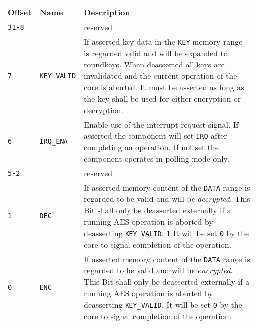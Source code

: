 \documentclass{ruschidoc}
\begin{document}
\begin{tabularx}{\textwidth}{|p{13mm}|p{18mm} |X|}
  \hline
  \bf{Offset} 	  & \bf{Name} & \bf{Description}\\ \hline
  \texttt{31-8} & --- & reserved \\ \hline 	 
  \texttt{7} 	 &\texttt{KEY\_VALID} &If asserted key data in the \texttt{KEY} memory range is regarded valid and will be expanded to roundkeys. 
	When deasserted all keys are invalidated and the current operation of the core is aborted. It must be asserted as long as the key shall be 
	used for either encryption or decryption. \\ \hline
  \texttt{6}   & \texttt{IRQ\_ENA}  & Enable use of the interrupt request signal. If asserted the component will set \texttt{IRQ} after 
					completing an operation. If not set the component operates in polling mode only.\\ \hline	 
  \texttt{5-2}   & --- &reserved  \\ \hline	 
  \texttt{1} 	&  \texttt{DEC} \footnotemark[1] &  If asserted memory content of the \texttt{DATA} range is regarded to be valid and will be 
	\emph{decrypted}. This Bit shall only be deasserted externally if a running AES operation is aborted by deasserting \texttt{KEY\_VALID}. 1
	It will be set \texttt{0} by the core to signal completion of the operation.\\ \hline	 
  \texttt{0} 	&  \texttt{ENC} \footnotemark[1] & If asserted memory content of the \texttt{DATA} range is regarded to be valid and will be 
	\emph{encrypted}. This Bit shall only be deasserted externally if a running AES operation is aborted by deasserting \texttt{KEY\_VALID}.
	 It will be set \texttt{0} by the core to signal completion of the operation. \\ \hline	 
\end{tabularx}
\label{tab:ctrlreg}
\end{document}
